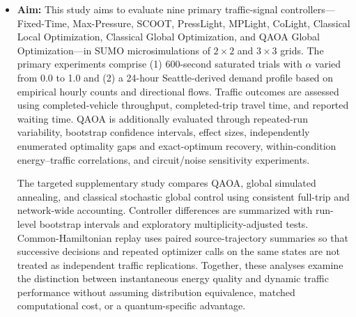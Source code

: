 \begin{itemize}
\item \textbf{Aim:} This study aims to evaluate nine primary traffic-signal controllers---Fixed-Time, Max-Pressure, SCOOT, PressLight, MPLight, CoLight, Classical Local Optimization, Classical Global Optimization, and QAOA Global Optimization---in SUMO microsimulations of $2\times2$ and $3\times3$ grids. The primary experiments comprise (1) 600-second saturated trials with $\alpha$ varied from 0.0 to 1.0 and (2) a 24-hour Seattle-derived demand profile based on empirical hourly counts and directional flows. Traffic outcomes are assessed using completed-vehicle throughput, completed-trip travel time, and reported waiting time. QAOA is additionally evaluated through repeated-run variability, bootstrap confidence intervals, effect sizes, independently enumerated optimality gaps and exact-optimum recovery, within-condition energy--traffic correlations, and circuit/noise sensitivity experiments.

The targeted supplementary study compares QAOA, global simulated annealing, and classical stochastic global control using consistent full-trip and network-wide accounting. Controller differences are summarized with run-level bootstrap intervals and exploratory multiplicity-adjusted tests. Common-Hamiltonian replay uses paired source-trajectory summaries so that successive decisions and repeated optimizer calls on the same states are not treated as independent traffic replications. Together, these analyses examine the distinction between instantaneous energy quality and dynamic traffic performance without assuming distribution equivalence, matched computational cost, or a quantum-specific advantage.
\end{itemize}

